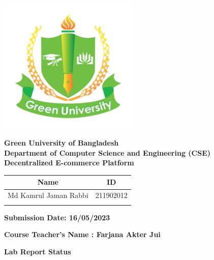 \documentclass[a4paper,11pt]{article}
\begin{document}
\begin{center}
\begin{table}[h]
\begin{tabular}{|p{4cm}|p{6cm}|p{4cm}|}
\end{tabular}
\end{table}

\newpage


\begin{center}

\includegraphics[width=0.5\textwidth]{Green_University_of_Bangladesh_logo.svg.png} 


\textbf{\normalsize{ Green University of Bangladesh}} \\
\textbf{\normalsize{Department of Computer Science and Engineering (CSE)}}\\[1cm]

\textbf{\LARGE{Decentralized E-commerce Platform}}\\[1cm]

\begin{table}[H]
    \centering
    \begin{tabular}{|c|c|} \hline
       \textbf{Name} &  \textbf{ID} \\ \hline
       Md Kamrul Jaman Rabbi & 211902012  \\ \hline
         &  \\ \hline
       
    \end{tabular}
   
\end{table} 

\vspace{0.5cm}


 
\textbf{\large Submission Date: 16/05/2023}
\vspace{1cm}

\textbf{\large Course Teacher's Name : Farjana Akter Jui}

\begin{center}
\textbf{Lab Report Status}
\end{center}


\end{center}
\end{center}
\end{document}
